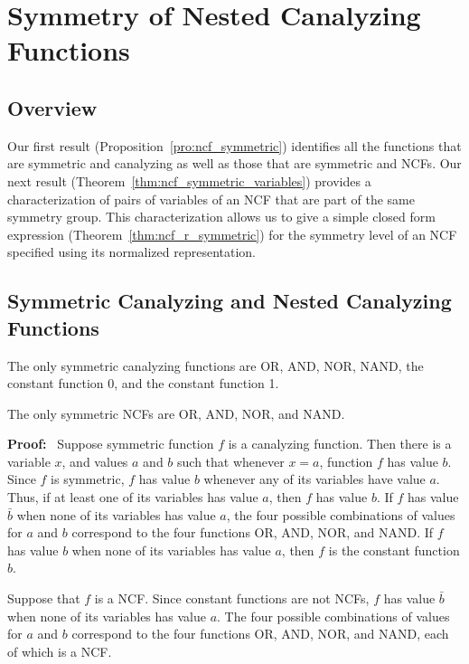 \section{Symmetry of Nested Canalyzing Functions}
\label{sse:ncf_and_symmetry}

\subsection{Overview}
\label{sse:res_overview}
Our first result (Proposition~\ref{pro:ncf_symmetric})
identifies all the functions that are symmetric and
canalyzing as well as those that are symmetric and NCFs.
Our next result (Theorem~\ref{thm:ncf_symmetric_variables})
provides a characterization of pairs of variables of an NCF
that are part of the same symmetry group. 
This characterization allows us to give a simple closed form
expression (Theorem~\ref{thm:ncf_r_symmetric}) 
for the symmetry level of an NCF specified using
its normalized representation.

\subsection{Symmetric Canalyzing and Nested Canalyzing Functions}
\label{sse:sym_and_cf_ncf}

\begin{proposition}\label{pro:ncf_symmetric}
The only symmetric canalyzing functions are OR, AND, NOR, NAND, 
the constant function 0, and the constant function 1.

The only symmetric NCFs are OR, AND, NOR, and NAND.
\end{proposition}
\noindent
\textbf{Proof:}~
Suppose symmetric function $f$ is a canalyzing function. Then there
is a variable $x$, and values $a$ and $b$ such that whenever $x =
a$, function $f$ has value $b$.  Since $f$ is symmetric, $f$  has
value $b$ whenever any of its variables have value $a$.  Thus, if
at least one of its variables has value $a$, then $f$ has value
$b$.  If $f$ has value $\bar{b}$ when none of its variables has
value $a$, the four possible combinations of values for $a$ and $b$
correspond to the four functions OR, AND, NOR, and NAND.  If $f$
has value $b$ when none of its variables has value $a$, then $f$
is the constant function $b$.

Suppose that $f$ is a NCF.  Since constant functions are not NCFs,
$f$ has value $\bar{b}$ when none of its variables has value $a$.
The four possible combinations of values for $a$ and $b$ correspond
to the four functions OR, AND, NOR, and NAND, each of which is a
NCF.  \QED

